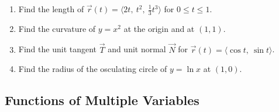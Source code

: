 \documentclass[12pt]{article}
\newcounter{topic}
\begin{document}
\begin{enumerate}
\begin{enumerate}
\begin{enumerate}
        \end{enumerate}
        \item Find the length of $\vec r(t)=\langle 2t,\ t^2,\ \tfrac13 t^3\rangle$ for $0\le t\le 1$.
        \item Find the curvature of $y=x^2$ at the origin and at $(1,1)$.
        \item Find the unit tangent $\vec T$ and unit normal $\vec N$ for $\vec r(t)=\langle \cos t,\ \sin t\rangle$.
        \item Find the radius of the osculating circle of $y=\ln x$ at $(1,0)$.
    \end{enumerate}
\newpage
\setcounter{topic}{\value{enumi}}
\end{enumerate}
\subsection*{Functions of Multiple Variables}
\end{document}
